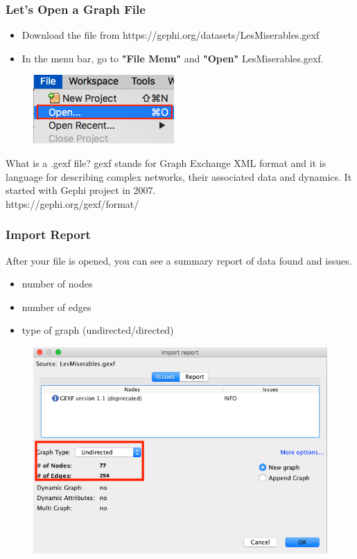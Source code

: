 \documentclass[10pt]{beamer}
\begin{document}
\begin{frame}
\frametitle{Let's Open a Graph File}
\begin{itemize}
\item Download the file from https://gephi.org/datasets/LesMiserables.gexf
\item In the menu bar, go to \textbf{"File Menu"} and \textbf{"Open"} LesMiserables.gexf.
\end{itemize}

\begin{figure}
\includegraphics[width=0.4\linewidth]{figures/open.png}
\end{figure}

What is a .gexf file? gexf stands for Graph Exchange XML format and it is language for describing complex networks, their associated data and dynamics. It started with Gephi project in 2007. \\
https://gephi.org/gexf/format/ 
\end{frame}


\begin{frame}
\frametitle{Import Report}

After your file is opened, you can see a summary report of data found and issues.
\begin{itemize}
	\item number of nodes
	\item number of edges
	\item type of graph (undirected/directed)
\end{itemize}
\begin{figure}
\includegraphics[width=0.5\linewidth]{figures/import_report.png}
\end{figure}
\end{frame}
\end{document}
